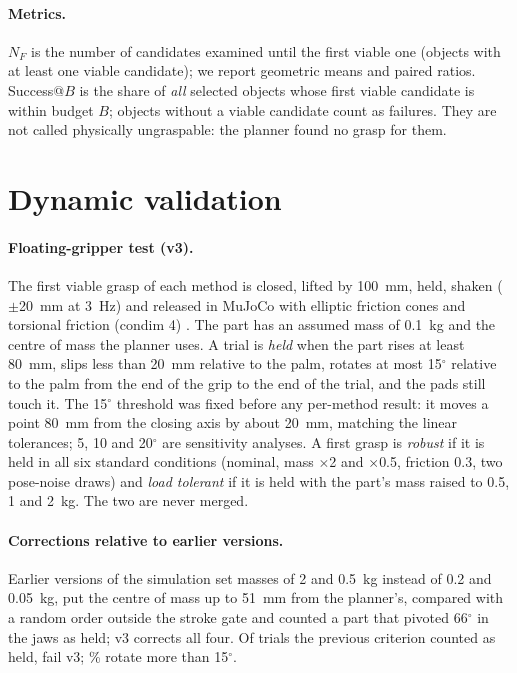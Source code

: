 \documentclass[pdflatex,sn-mathphys-num,iicol]{sn-jnl}
\begin{document}
\paragraph{Metrics.} $N_F$ is the number of candidates examined until the first viable one (objects with at least one viable candidate); we report geometric means and paired ratios. Success@$B$ is the share of \emph{all} selected objects whose first viable candidate is within budget $B$; objects without a viable candidate count as failures. They are not called physically ungraspable: the planner found no grasp for them.

\section{Dynamic validation}\label{sec:physics}

\paragraph{Floating-gripper test (v3).} The first viable grasp of each method is closed, lifted by 100~mm, held, shaken ($\pm$20~mm at 3~Hz) and released in MuJoCo with elliptic friction cones and torsional friction (condim 4) \cite{todorov2012mujoco}. The part has an assumed mass of 0.1~kg and the centre of mass the planner uses. A trial is \emph{held} when the part rises at least 80~mm, slips less than 20~mm relative to the palm, rotates at most 15$^\circ$ relative to the palm from the end of the grip to the end of the trial, and the pads still touch it. The 15$^\circ$ threshold was fixed before any per-method result: it moves a point 80~mm from the closing axis by about 20~mm, matching the linear tolerances; 5, 10 and 20$^\circ$ are sensitivity analyses. A first grasp is \emph{robust} if it is held in all six standard conditions (nominal, mass $\times$2 and $\times$0.5, friction 0.3, two pose-noise draws) and \emph{load tolerant} if it is held with the part's mass raised to 0.5, 1 and 2~kg. The two are never merged.

\paragraph{Corrections relative to earlier versions.} Earlier versions of the simulation set masses of 2 and 0.5~kg instead of 0.2 and 0.05~kg, put the centre of mass up to 51~mm from the planner's, compared with a random order outside the stroke gate and counted a part that pivoted 66$^\circ$ in the jaws as held; v3 corrects all four. Of \devVtwoHeld{} trials the previous criterion counted as held, \devVtwoNotVthree{} fail v3; \devTurnOverFifteen\% rotate more than 15$^\circ$.
\end{document}
